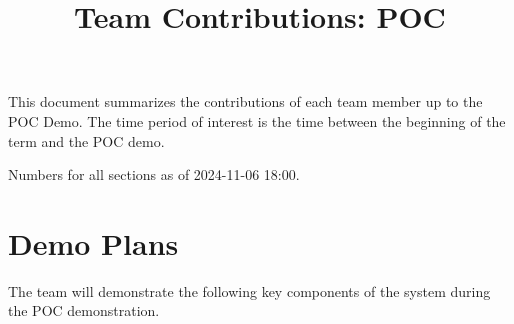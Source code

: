 \documentclass{article}
\title{Team Contributions: POC\\\progname}
\author{\authname}
\date{}
\begin{document}
\maketitle

This document summarizes the contributions of each team member up to the POC
Demo.  The time period of interest is the time between the beginning of the term
and the POC demo.

Numbers for all sections as of 2024-11-06 18:00.

\section{Demo Plans}

\noindent The team will demonstrate the following key components of the system during the POC demonstration. 
\end{document}
